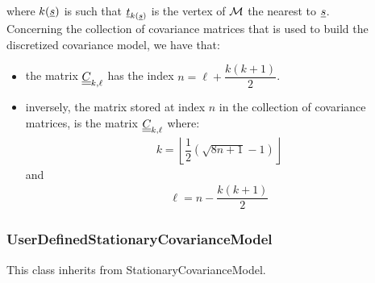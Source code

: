 where $k({\underline{s}})$ is such that ${\underline{t}}_{k({\underline{s}})}$ is the  vertex of ${\mathcal M}$ the nearest to ${\underline{s}}$.\\
Concerning the  collection of covariance matrices that is used to build the discretized covariance model, we have that:
\begin{itemize}
\item the  matrix ${\underline{\underline{C}}}_{k,\ell}$ has the index $n=\ell +\dfrac{k(k+1)}{2}$.
\item inversely, the matrix stored at index $n$ in the collection of covariance matrices, is the matrix ${\underline{\underline{C}}}_{k,\ell}$ where:
\begin{align*}
k=\left\lfloor \dfrac{1}{2}\left( \sqrt{8n+1}-1 \right) \right\rfloor
\end{align*}
and
\begin{align*}
\ell= n-\dfrac{k(k+1)}{2}
\end{align*}
\end{itemize}
\bigskip

\newpage \subsubsection{UserDefinedStationaryCovarianceModel}

This class inherits from StationaryCovarianceModel.\\

